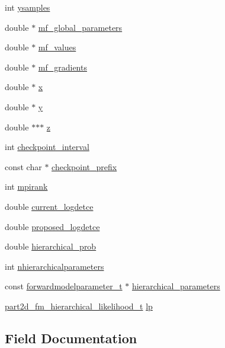 \begin{DoxyCompactItemize}
int \hyperlink{structpart2dfm_a734cb1341cafde5f78fe5703b0ccc431}{ysamples}
\item 
double $\ast$ \hyperlink{structpart2dfm_aafdf454cb831c2069921c101fdef9eee}{mf\+\_\+global\+\_\+parameters}
\item 
double $\ast$ \hyperlink{structpart2dfm_a98e449e722a9d18c02102c74f5a02149}{mf\+\_\+values}
\item 
double $\ast$ \hyperlink{structpart2dfm_a3f37e5875df194098a83a1013b2c28a7}{mf\+\_\+gradients}
\item 
double $\ast$ \hyperlink{structpart2dfm_a7c8db002ece90497df8ae33cc33e7893}{x}
\item 
double $\ast$ \hyperlink{structpart2dfm_a010d561ad03fa50c4b4a15046268fbef}{y}
\item 
double $\ast$$\ast$$\ast$ \hyperlink{structpart2dfm_a73279bf493761b119d0eef31b35e4ebd}{z}
\item 
int \hyperlink{structpart2dfm_af6218a03077acb5ab203ebc433d9dff3}{checkpoint\+\_\+interval}
\item 
const char $\ast$ \hyperlink{structpart2dfm_ae70d8586e036ef85214eec8ef68ed857}{checkpoint\+\_\+prefix}
\item 
int \hyperlink{structpart2dfm_aefe781530739011dadc002397e4258b8}{mpirank}
\item 
double \hyperlink{structpart2dfm_ad539c00d46cbbe28f446ccf1fa35ab4c}{current\+\_\+logdetce}
\item 
double \hyperlink{structpart2dfm_aa056d200c5db8c16d3d5a757916477ec}{proposed\+\_\+logdetce}
\item 
double \hyperlink{structpart2dfm_abf70bf0a9e6ab23ebf4b616d34742990}{hierarchical\+\_\+prob}
\item 
int \hyperlink{structpart2dfm_a148a67222a4101bd9172e9399246c0f8}{nhierarchicalparameters}
\item 
const \hyperlink{forwardmodelparameter_8h_a18a7d2fd51fab097145725d83ac328e3}{forwardmodelparameter\+\_\+t} $\ast$ \hyperlink{structpart2dfm_ab229f71a3a8bcf91e167836bb6cfe563}{hierarchical\+\_\+parameters}
\item 
\hyperlink{forwardmodel_8h_a150ffbf03b04c658872258953574b7e5}{part2d\+\_\+fm\+\_\+hierarchical\+\_\+likelihood\+\_\+t} \hyperlink{structpart2dfm_a6c9bb5290acb91254fa96c4350d81076}{lp}
\end{DoxyCompactItemize}


\subsection{Field Documentation}
